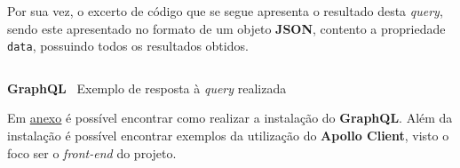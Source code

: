 Por sua vez, o excerto de código que se segue apresenta o resultado desta \textit{query}, sendo este apresentado no formato de um objeto \textbf{JSON}, contento a propriedade \texttt{data}, possuindo todos os resultados obtidos.

\begin{longlisting}
	\inputminted{json}{code/graphql/example-result.json}
	\caption{\textbf{GraphQL} \textemdash~Exemplo de resposta à \textit{query} realizada}
\end{longlisting}

Em \underline{\hyperref[graphqlAttachments]{anexo}} é possível encontrar como realizar a instalação do \textbf{GraphQL}. Além da instalação é possível encontrar exemplos da utilização do \textbf{Apollo Client}, visto o foco ser o \textit{front-end} do projeto.